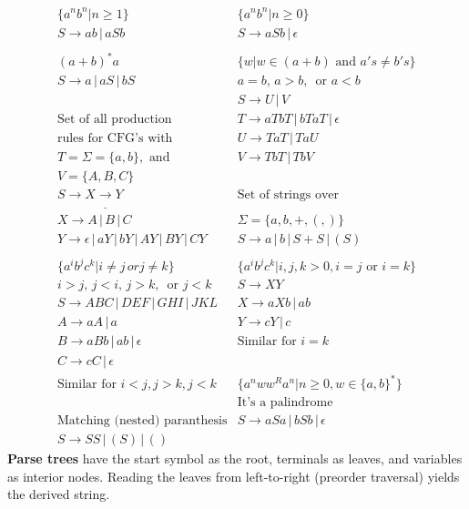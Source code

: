 \documentclass[8pt,letterpaper,twocolumn]{article}
\begin{document}
\begin{eqnarray*}
  \{a^n b^n | n \geq 1\} & \{a^n b^n | n \geq 0\} \\
  S \rightarrow ab \,|\, aSb & S \rightarrow aSb \,|\, \epsilon \\
  \\
  (a+b)^*a & \{w | w \in (a+b) \mbox{ and } a's \neq b's\} \\
  S \rightarrow a \,|\, aS \,|\, bS & a = b,\, a > b,\, \mbox{ or } a < b \\
   & S \rightarrow U \,|\, V \\
  \mbox{Set of all production} & T \rightarrow aTbT \,|\, bTaT \,|\, \epsilon \\
  \mbox{rules for CFG's with} & U \rightarrow TaT \,|\, TaU \\
  T=\Sigma=\{a,b\}, \mbox{ and} & V \rightarrow TbT \,|\, TbV \\ 
  V=\{A,B,C\} &  \\
  S \rightarrow X \underline{\rightarrow} Y & \mbox{Set of strings over} \\
  X \rightarrow A \,|\, B \,|\, C & \Sigma = \{a,b,+,(,)\} \\
  Y \rightarrow \epsilon \,|\, aY \,|\, bY \,|\, AY \,|\, BY \,|\, CY & S \rightarrow a \,|\, b \,|\, S + S \,|\, (S)\\
  \\
  \{a^i b^j c^k | i \neq j \, or j \neq k\} & \{a^i b^j c^k | i,j,k > 0, i=j \mbox{ or } i=k\} \\
  i>j,\, j<i,\, j>k,\, \mbox{ or } j<k &  S \rightarrow XY \\
  S \rightarrow ABC \,|\, DEF \,|\, GHI \,|\, JKL & X \rightarrow aXb \,|\, ab \\
  A \rightarrow aA \,|\, a & Y \rightarrow cY \,|\, c \\
  B \rightarrow aBb \,|\, ab \,|\, \epsilon & \mbox{Similar for } i=k \\
  C \rightarrow cC \,|\, \epsilon & \\
  \mbox{Similar for } i<j, j>k, j<k & \{a^n w w^R a^n | n \geq 0, w \in \{a,b\}^* \} \\
  & \mbox{It's a palindrome} \\
  \mbox{Matching (nested) paranthesis} & S \rightarrow aSa \,|\, bSb \,|\, \epsilon \\
  S \rightarrow SS \,|\, (S) \,|\, () &
\end{eqnarray*}
\textbf{Parse trees} have the start symbol as the root, terminals as leaves, and variables as interior
nodes. Reading the leaves from left-to-right (preorder traversal) yields the derived string.\\
\end{document}
